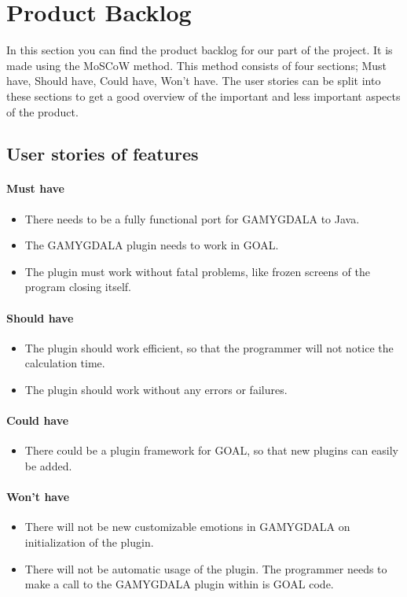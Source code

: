 \section{Product Backlog}
In this section you can find the product backlog for our part of the project. It is made using the MoSCoW method. This method consists of four sections; Must have, Should have, Could have, Won't have. The user stories can be split into these sections to get a good overview of the important and less important aspects of the product.

\subsection{User stories of features}
\paragraph{Must have} 
\begin{itemize}
\item There needs to be a fully functional port for GAMYGDALA to Java.
\item The GAMYGDALA plugin needs to work in GOAL.
\item The plugin must work without fatal problems, like frozen screens of the program closing itself.
\end{itemize}

\paragraph{Should have} 
\begin{itemize}
\item The plugin should work efficient, so that the programmer will not notice the calculation time.
\item The plugin should work without any errors or failures. 
\end{itemize}

\paragraph{Could have} 
\begin{itemize}
\item There could be a plugin framework for GOAL, so that new plugins can easily be added.
\end{itemize}

\paragraph{Won't have} 
\begin{itemize}
\item There will not be new customizable emotions in GAMYGDALA on initialization of the plugin.
\item There will not be automatic usage of the plugin. The programmer needs to make a call to the GAMYGDALA plugin within is GOAL code.
\end{itemize}

